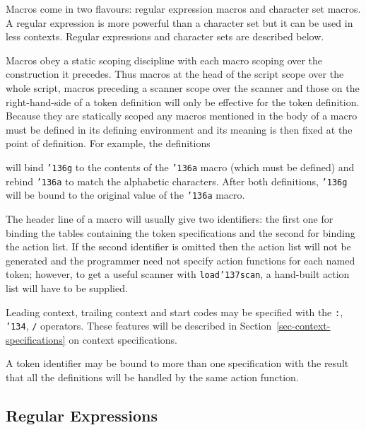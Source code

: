 Macros come in two flavours: regular expression macros and character set
macros.  A regular expression is more powerful than a character set but it can
be used in less contexts.  Regular expressions and character sets are described
below.

Macros obey a static scoping discipline with each macro scoping over the
construction it precedes.  Thus macros at the head of the script scope over the
whole script, macros preceding a scanner scope over the scanner and those on
the right-hand-side of a token definition will only be effective for the token
definition.  Because they are statically scoped any macros mentioned in the
body of a macro must be defined in its defining environment and its meaning is
then fixed at the point of definition.  For example, the definitions


will bind \mbox{\tt {\char'136}g} to the contents of the \mbox{\tt {\char'136}a} macro (which must be defined) and
rebind \mbox{\tt {\char'136}a} to match the alphabetic characters.  After both definitions, \mbox{\tt {\char'136}g}
will be bound to the original value of the \mbox{\tt {\char'136}a} macro.

The header line of a macro will usually give two identifiers: the first one for
binding the tables containing the token specifications and the second for
binding the action list.  If the second identifier is omitted then the action
list will not be generated and the programmer need not specify action functions
for each named token; however, to get a useful scanner with \mbox{\tt load{\char'137}scan}, a
hand-built action list will have to be supplied.

Leading context, trailing context and start codes may be specified with the
\mbox{\tt :}, \mbox{\tt {\char'134}}, \mbox{\tt /} operators.  These features will be described in
Section~\ref{sec-context-specifications} on context specifications.

A token identifier may be bound to more than one specification with the result
that all the definitions will be handled by the same action function.


\subsection{Regular Expressions}

